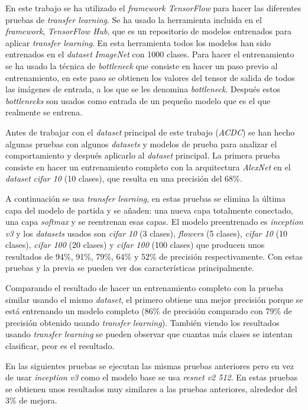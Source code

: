 \documentclass[12pt,a4paper]{article}
\begin{document}
En este trabajo se ha utilizado el \textit{framework TensorFlow} para hacer las diferentes pruebas de \textit{transfer learning}. Se ha usado la herramienta incluida en el \textit{framework}, \textit{TensorFlow Hub}, que es un repositorio de modelos entrenados para aplicar \textit{transfer learning}. En esta herramienta todos los modelos han sido entrenados en el \textit{dataset} \textit{ImageNet} con 1000 clases. Para hacer el entrenamiento se ha usado la técnica de \textit{bottleneck} que consiste en hacer un paso previo al entrenamiento, en este paso se obtienen los valores del tensor de salida de todos las imágenes de entrada, a los que se les denomina \textit{bottleneck}. Después estos \textit{bottlenecks} son usados como entrada de un pequeño modelo que es el que realmente se entrena.
\bigskip

Antes de trabajar con el \textit{dataset} principal de este trabajo (\textit{ACDC}) se han hecho algunas pruebas con algunos \textit{datasets} y modelos de prueba para analizar el comportamiento y después aplicarlo al \textit{dataset} principal. La primera prueba consiste en hacer un entrenamiento completo con la arquitectura \textit{AlexNet} en el \textit{dataset} \textit{cifar 10} (10 clases), que resulta en una precisión del 68\%.
\bigskip

A continuación se usa \textit{transfer learning}, en estas pruebas se elimina la última capa del modelo de partida y se añaden: una nueva capa totalmente conectado, una capa \textit{softmax} y se reentrenan esas capas. El modelo preentrenado es \textit{inception v3} y los \textit{datasets} usados son \textit{cifar 10} (3 clases), \textit{flowers} (5 clases), \textit{cifar 10} (10 clases), \textit{cifar 100} (20 clases) y \textit{cifar 100} (100 clases) que producen unos resultados de 94\%, 91\%, 79\%, 64\% y 52\% de precisión respectivamente. Con estas pruebas y la previa se pueden ver dos características principalmente.
\bigskip

Comparando el resultado de hacer un entrenamiento completo con la prueba similar usando el mismo \textit{dataset}, el primero obtiene una mejor precisión porque se está entrenando un modelo completo (86\% de precisión comparado con 79\% de precisión obtenido usando \textit{transfer learning}). También viendo los resultados usando \textit{transfer learning} se pueden observar que cuantas más clases se intentan clasificar, peor es el resultado.
\bigskip

En las siguientes pruebas se ejecutan las mismas pruebas anteriores pero en vez de usar \textit{inception v3} como el modelo base se usa \textit{resnet v2 512}. En estas pruebas se obtienen unos resultados muy similares a las pruebas anteriores, alrededor del 3\% de mejora.
\bigskip
\end{document}
